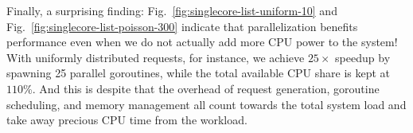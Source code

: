Finally, a surprising finding: Fig.~\ref{fig:singlecore-list-uniform-10} and Fig.~\ref{fig:singlecore-list-poisson-300} indicate that parallelization benefits performance even when we do not actually add more CPU power to the system! With uniformly distributed requests, for instance, we achieve $25\times$ speedup by spawning 25 parallel goroutines, while the total available CPU share is kept at $110$\%. %
And this is despite that the overhead of request generation, goroutine scheduling, and memory management all count towards the total system load and take away precious CPU time from the workload.


%








